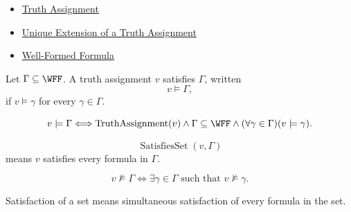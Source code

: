 \begin{dependencies}
\begin{itemize}
  \item \hyperref[def:truth-assignment-propositional-logic]{Truth Assignment}
  \item \hyperref[thm:unique-extension-truth-assignment-propositional-logic]{Unique Extension of a Truth Assignment}
  \item \hyperref[def:well-formed-formula]{Well-Formed Formula}
\end{itemize}
\end{dependencies}
\begin{tcolorbox}[colback=propbox, colframe=propborder, arc=2pt,
  left=6pt, right=6pt, top=4pt, bottom=4pt,
  title={\small\textbf{Definition (Satisfaction of a Set of Formulas)}},
  fonttitle=\small\bfseries]
\begin{definition}
\label{def:satisfaction-set-propositional-logic}
Let \(\Gamma\subseteq\WFF\). A truth assignment \(v\) satisfies \(\Gamma\), written
\[
v\models\Gamma,
\]
if \(v\models\gamma\) for every \(\gamma\in\Gamma\).
\end{definition}
\end{tcolorbox}

\begin{remark*}
\[
v\models\Gamma
\Longleftrightarrow
\operatorname{TruthAssignment}(v)
\land
\Gamma\subseteq\WFF
\land
(\forall\gamma\in\Gamma)(v\models\gamma).
\]
\end{remark*}

\begin{remark*}
\[
\operatorname{SatisfiesSet}(v,\Gamma)
\]
means \(v\) satisfies every formula in \(\Gamma\).
\end{remark*}

\begin{remark*}
\[
v\not\models\Gamma
\Longleftrightarrow
\exists\gamma\in\Gamma\text{ such that }v\not\models\gamma.
\]
\end{remark*}

\begin{remark*}[Interpretation]
Satisfaction of a set means simultaneous satisfaction of every formula in the set.
\end{remark*}

